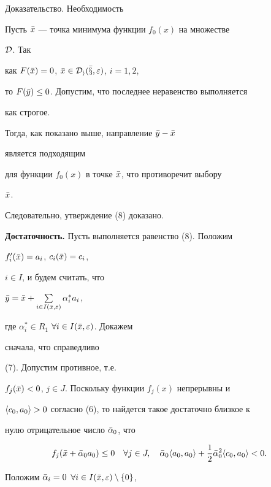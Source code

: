 \begin{pf*}{Доказательство. Необходимость}


Пусть $\Bar x$ --- точка минимума функции $f_0(x)$ на множестве


$\cal D$. Так


как $F(\Bar x)=0$, $\Bar x\in\cal D_i(\Bar x,\varepsilon)$, $i=1,2$,


то $F(\Bar y)\le 0$. Допустим, что последнее неравенство выполняется


как строгое.


Тогда, как показано выше, направление $\Bar y-\Bar x$


является подходящим


для функции $f_0(x)$ в точке $\Bar x$, что противоречит выбору


$\Bar x$.


Следовательно, утверждение (8) доказано.


\medskip





{\bf Достаточность.} Пусть выполняется равенство (8). Положим


$f'_i(\Bar x)=a_i$, $c_i(\Bar x)=c_i$,


$i\in I$, и будем считать, что


$\Bar y=\Bar x+\sum\limits_{i\in I(\Bar x,\varepsilon)}\alpha^*_ia_i$,


где $\alpha^*_i\in R_1$ $\forall i\in I(\Bar x,\varepsilon)$. Докажем


сначала, что справедливо


(7). Допустим противное, т.е.


$f_j(\Bar x)<0$, $j\in J$. Поскольку функции $f_j(x)$ непрерывны и


$\langle c_0,a_0\rangle>0$ согласно (6), то найдется такое достаточно близкое к


нулю отрицательное число $\Bar \alpha_0$, что


\begin{equation}


f_j(\Bar x+\Bar \alpha_0a_0)\le 0\quad \forall j\in J,\quad


\Bar \alpha_0\la a_0,a_0\ra+\frac{1}{2}\Bar \alpha^2_0\la c_0,a_0\ra<0.


\end{equation}


Положим $\Bar \alpha_i=0$ $\forall i\in I(\Bar x,\varepsilon)\setminus


\{0\}$,



\end{pf*}
